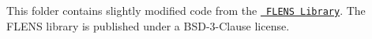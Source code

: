 This folder contains slightly modified code from the \href{https://github.com/michael-lehn/FLENS}{\texttt{ FLENS Library}}. The FLENS library is published under a BSD-\/3-\/\+Clause license. 